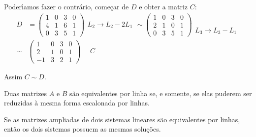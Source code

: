 \begin{exemplos}
\begin{enumerate}[label={\arabic*})]
            Poder{\'\i}amos fazer o contr\'ario, come\c{c}ar de $D$ e obter a matriz $C$:
            \begin{align*}
                D &= \begin{pmatrix}
                    1 & 0 & 3 & 0\\
                    4 & 1 & 6 & 1\\
                    0 & 3 & 5 & 1
                \end{pmatrix}
                \begin{array}{l}
                    \phantom{x}\\ L_2 \to L_2 - 2L_1\\\phantom{x}
                \end{array} \sim
                \begin{pmatrix}
                    1 & 0 & 3 & 0\\
                    2 & 1 & 0 & 1\\
                    0 & 3 & 5 & 1
                \end{pmatrix}
                \begin{array}{l}
                    \phantom{x}\\ \phantom{x}\\ L_3 \to L_3 - L_1
                \end{array}\\ \sim
                  &\begin{pmatrix}
                    1 & 0 & 3 & 0\\
                    2 & 1 & 0 & 1\\
                    -1 & 3 & 2 & 1
                \end{pmatrix} = C
            \end{align*}

            Assim $C \sim D$.
    \end{enumerate}
\end{exemplos}
\begin{teorema}
    Duas matrizes $A$ e $B$ s\~ao equivalentes por linha se, e somente, se elas puderem ser reduzidas \`a mesma forma escalonada por linhas.
\end{teorema}

\begin{teorema}
    Se as matrizes ampliadas de dois sistemas lineares s\~ao equivalentes por linhas, ent\~ao os dois sistemas possuem as mesmas solu\c{c}\~oes.
\end{teorema}

